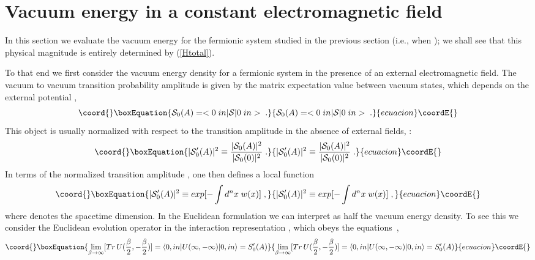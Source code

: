 \documentclass[a4paper,12pt]{article}
\providecommand{\Fd}{\widetilde{F}}
\providecommand{\n}{\eta}
\begin{document}
\section{Vacuum energy in a constant electromagnetic 
  field}\label{sec:vacuum}
In this section we evaluate the vacuum energy for the fermionic
system studied in the previous section (i.e., when \myHighlight{$\Fd \cdot \n =0$}\coordHE{}); we shall 
see that this physical magnitude is entirely determined by
(\ref{Htotal}). 

To that end we first consider the vacuum energy density for a
fermionic system in the presence of an external electromagnetic field.
The vacuum to vacuum transition probability amplitude is given by the
\coordHE{} matrix expectation value between vacuum states, which depends
on the external potential \coordHE{},
\begin{equation}\coord{}\boxEquation{
{\mathcal S}_0(A)=< 0 \;in | {\mathcal S} | 0 \;in > \;.
}{
{\mathcal S}_0(A)=< 0 \;in | {\mathcal S} | 0 \;in > \;.
}{ecuacion}\coordE{}\end{equation}
This object is usually normalized with respect to the transition
amplitude in the absence of external fields, \coordHE{}:
\begin{equation}\coord{}\boxEquation{\label{s0}
|{\mathcal S}'_0(A)|^2 \equiv \frac{|{\mathcal S}_0(A)|^2}
{|{\mathcal S}_0(0)|^2}\;.
}{|{\mathcal S}'_0(A)|^2 \equiv \frac{|{\mathcal S}_0(A)|^2}
{|{\mathcal S}_0(0)|^2}\;.
}{ecuacion}\coordE{}\end{equation}
In terms of the normalized transition amplitude \coordHE{},
one then defines a local function \coordHE{}~\cite{itzykson}
\begin{equation}\coord{}\boxEquation{\label{w}
|{\mathcal S}'_0(A)|^2 \equiv exp[-\int d^nx\;w(x)] \;,
}{|{\mathcal S}'_0(A)|^2 \equiv exp[-\int d^nx\;w(x)] \;,
}{ecuacion}\coordE{}\end{equation}
where \coordHE{} denotes the spacetime dimension. In the Euclidean
formulation we can interpret \coordHE{} as half the vacuum energy density.
To see this we consider the Euclidean evolution operator in the
interaction representation \coordHE{}, which obeys the
equations~\cite{zinnjustin},
\begin{equation}\coord{}\boxEquation{\label{S0euclideo}
\lim_{\beta\to\infty}[Tr\,U(\frac{\beta}{2},-\frac{\beta}{2})]=\langle0, in|U(\infty,-\infty)|0,in \rangle = S'_0(A)
}{\lim_{\beta\to\infty}[Tr\,U(\frac{\beta}{2},-\frac{\beta}{2})]=\langle0, in|U(\infty,-\infty)|0,in \rangle = S'_0(A)
}{ecuacion}\coordE{}\end{equation}
\end{document}
